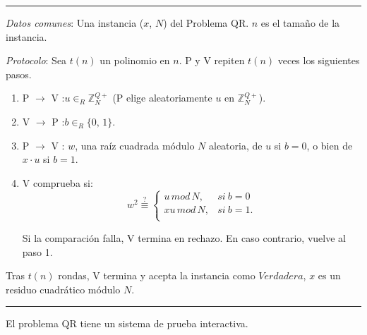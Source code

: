 \rule{\textwidth}{1pt}
\begin{algorithm}
	
	\hfil
	
	\textit{Datos comunes}: Una instancia ($x$, $N$) del Problema QR. $n$ es el tamaño de la instancia.
	
	\textit{Protocolo}: Sea $t(n)$ un polinomio en $n$. P y V repiten $t(n)$ veces los siguientes pasos.
	
	\begin{enumerate}
		
		\item P $\rightarrow$ V :\quad $u \in_R \mathbb{Z}^{Q+}_N$ \quad (P elige aleatoriamente $u$ en $\mathbb{Z}^{Q+}_N$).
		
		\item V $\rightarrow$ P :\quad $b \in_R \{0,\,1\}$.
		
		\item P $\rightarrow$ V :\; $w$,\; una raíz cuadrada módulo $N$ aleatoria, de $u$ si $b=0$, o bien de $x\cdot u$ si $b=1$.
		
		\item V comprueba si:
		\[
			w^2 \overset{?}{\equiv}
			\begin{cases}
				u\, mod\, N, & si\ b = 0\\
				xu\, mod\, N, & si\ b = 1.\\
			\end{cases}
		\]
		
		Si la comparación falla, V termina en rechazo. En caso contrario, vuelve al paso 1.
		
		
	\end{enumerate}

	Tras $t(n)$ rondas, V termina y acepta la instancia como $Verdadera$, $x$ es un residuo cuadrático módulo $N$.
	
	\label{QRinteractive:alg}
\end{algorithm}
\rule{\textwidth}{1pt}

\hfil


\begin{theorem}
	El problema QR tiene un sistema de prueba interactiva.
	\label{theo:QRint}
\end{theorem}

